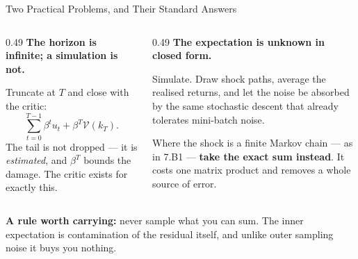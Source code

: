\begin{frame}{Two Practical Problems, and Their Standard Answers}
\begin{columns}[T]
\begin{column}{0.49\textwidth}
\small
\textbf{The horizon is infinite; a simulation is not.}
\medskip

Truncate at $T$ and close with the critic:
\[
  \sum_{t=0}^{T-1}\beta^{t}u_t+\beta^{T}\mathcal{V}(k_T).
\]
The tail is not dropped --- it is \emph{estimated}, and $\beta^{T}$ bounds the damage. The critic exists for exactly this.
\end{column}
\begin{column}{0.49\textwidth}
\small
\textbf{The expectation is unknown in closed form.}
\medskip

Simulate. Draw shock paths, average the realised returns, and let the noise be absorbed by the same stochastic descent that already tolerates mini-batch noise.
\medskip

Where the shock is a finite Markov chain --- as in 7.B1 --- \textbf{take the exact sum instead}. It costs one matrix product and removes a whole source of error.
\end{column}
\end{columns}
\medskip
\begin{takeawaybox}\footnotesize
\textbf{A rule worth carrying:} never sample what you can sum. The inner expectation is contamination of the residual itself, and unlike outer sampling noise it buys you nothing.
\end{takeawaybox}
\end{frame}

